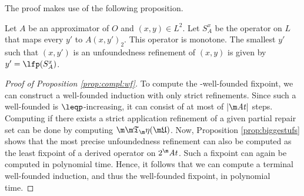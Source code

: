 The proof makes use of the following proposition. 
\begin{proposition}\label{prop:biggestufs}
Let $A$ be an approximator of $O$ and $(x,y)\in L^2$. 
Let $S_A^x$ be the operator on $L$ that maps every $y'$ to $A(x,y')_2$.
This operator is monotone. 
The smallest $y'$ such that $(x,y')$ is an unfoundedness refinement of $(x,y)$ is given by 
$y'=\lfp (S_A^x)$.
 \end{proposition}
 \begin{proof}[Proof of Proposition \ref{prop:compl:wf}]
 To compute the \Ap-well-founded fixpoint, we can construct a well-founded induction with only strict refinements. 
 Since such a well-founded is $\leqp$-increasing, it can consist of at most of $|\atoms|$ steps. 
 Computing if there exists a strict application refinement of a given partial repair set \UUU
can be done by computing $\Ap(\UUU)$. Now, Proposition \ref{prop:biggestufs} shows that the most precise unfoundedness refinement can also be computed as the least fixpoint of a derived operator on $2^\atoms$. Such a fixpoint can again be computed in polynomial time. Hence, it follows that we can compute a terminal well-founded induction, and thus the well-founded fixpoint, in polynomial time. 
%  
\end{proof}


